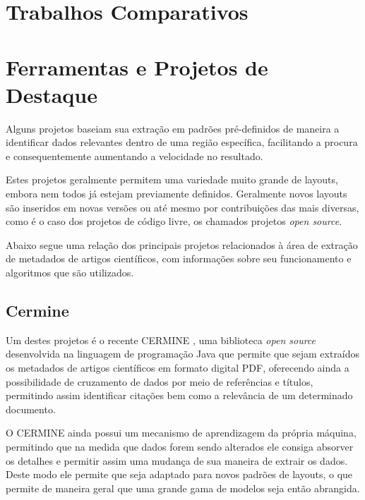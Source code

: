 \section{Trabalhos Comparativos}


\section{Ferramentas e Projetos de Destaque}

Alguns projetos baseiam sua extração em padrões pré-definidos de maneira a identificar dados relevantes dentro de uma região específica, facilitando a procura e consequentemente aumentando a velocidade no resultado. 

Estes projetos geralmente permitem uma variedade muito grande de layouts, embora nem todos já estejam previamente definidos. Geralmente novos layouts são inseridos em novas versões ou até mesmo por contribuições das mais diversas, como é o caso dos projetos de código livre, os chamados projetos \textit{open source}.

Abaixo segue uma relação dos principais projetos relacionados à área de extração de metadados de artigos científicos, com informações sobre seu funcionamento e algoritmos que são utilizados.

\subsection{Cermine}


Um destes projetos é o recente CERMINE \cite{cermine}, uma biblioteca \textit{open source} desenvolvida na linguagem de programação Java que permite que sejam extraídos os metadados de artigos científicos em formato digital PDF, oferecendo ainda a possibilidade de cruzamento de dados por meio de referências e títulos, permitindo assim identificar citações bem como a relevância de um determinado documento.

O CERMINE ainda possui um mecanismo de aprendizagem da própria máquina, permitindo que na medida que dados forem sendo alterados ele consiga absorver os detalhes e permitir assim uma mudança de sua maneira de extrair os dados. Deste modo ele permite que seja adaptado para novos padrões de layouts, o que permite de maneira geral que uma grande gama de modelos seja então abrangida. 

